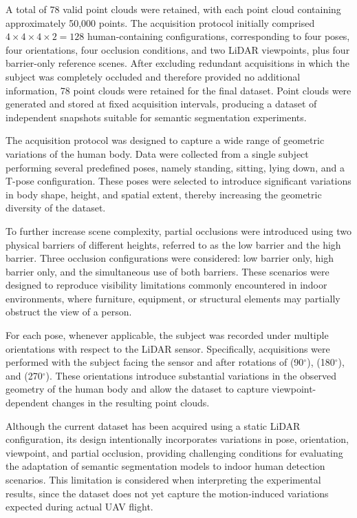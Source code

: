 A total of 78 valid point clouds were retained, with each point cloud containing approximately 50,000 points. The acquisition protocol initially comprised $4\times4\times4\times2=128$ human-containing configurations, corresponding to four poses, four orientations, four occlusion conditions, and two LiDAR viewpoints, plus four barrier-only reference scenes. After excluding redundant acquisitions in which the subject was completely occluded and therefore provided no additional information, 78 point clouds were retained for the final dataset. Point clouds were generated and stored at fixed acquisition intervals, producing a dataset of independent snapshots suitable for semantic segmentation experiments.


The acquisition protocol was designed to capture a wide range of geometric variations of the human body. Data were collected from a single subject performing several predefined poses, namely standing, sitting, lying down, and a T-pose configuration. These poses were selected to introduce significant variations in body shape, height, and spatial extent, thereby increasing the geometric diversity of the dataset.

To further increase scene complexity, partial occlusions were introduced using two physical barriers of different heights, referred to as the low barrier and the high barrier. Three occlusion configurations were considered: low barrier only, high barrier only, and the simultaneous use of both barriers. These scenarios were designed to reproduce visibility limitations commonly encountered in indoor environments, where furniture, equipment, or structural elements may partially obstruct the view of a person.

For each pose, whenever applicable, the subject was recorded under multiple orientations with respect to the LiDAR sensor. Specifically, acquisitions were performed with the subject facing the sensor and after rotations of (90$^\circ$), (180$^\circ$), and (270$^\circ$). These orientations introduce substantial variations in the observed geometry of the human body and allow the dataset to capture viewpoint-dependent changes in the resulting point clouds.

Although the current dataset has been acquired using a static LiDAR configuration, its design intentionally incorporates variations in pose, orientation, viewpoint, and partial occlusion, providing challenging conditions for evaluating the adaptation of semantic segmentation models to indoor human detection scenarios.
This limitation is considered when interpreting the experimental results, since the dataset does not yet capture the motion-induced variations expected during actual UAV flight.

